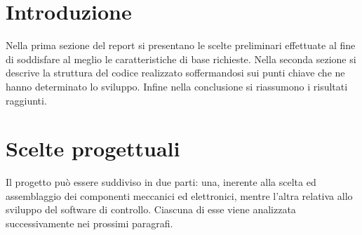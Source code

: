 \section*{Introduzione}
Nella prima sezione del report si presentano le scelte preliminari effettuate al fine di soddisfare al meglio le caratteristiche di base richieste. Nella seconda sezione si descrive la struttura del codice realizzato soffermandosi sui punti chiave che ne hanno determinato lo sviluppo. Infine nella conclusione si riassumono i risultati raggiunti.
\section{Scelte progettuali}
Il progetto può essere suddiviso in due parti: una, inerente alla scelta ed assemblaggio dei componenti meccanici ed elettronici, mentre l'altra relativa allo sviluppo del software di controllo.
Ciascuna di esse viene analizzata  successivamente nei prossimi paragrafi. 
